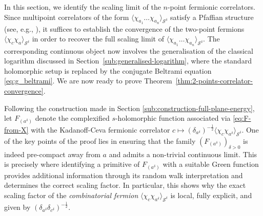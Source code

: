 \documentclass[reqno]{amsart}
\numberwithin{equation}{section}
\theoremstyle{definition}
\theoremstyle{remark}
\newcommand\cS{\mathcal{S}}
\begin{document}
In this section, we identify the scaling limit of the $n$-point fermionic correlators. Since multipoint correlators of the form $\langle \chi_{a_1} \ldots \chi_{a_n} \rangle_{\cS^\delta}$ satisfy a Pfaffian structure (see, e.g., \cite[Proposition 2.24]{CHI-mixed}), it suffices to establish the convergence of the two-point fermions $\langle \chi_{c} \chi_{a} \rangle_{\cS^\delta}$ in order to recover the full scaling limit of $\langle \chi_{a_1} \ldots \chi_{a_n} \rangle_{\cS^\delta}$. The corresponding continuous object now involves the generalisation of the classical logarithm discussed in Section~\ref{sub:generalised-logarithm}, where the standard holomorphic setup is replaced by the conjugate Beltrami equation \eqref{eq:g_beltrami}. We are now ready to prove Theorem~\ref{thm:2-points-correlator-convergence}.

Following the construction made in Section \ref{sub:construction-full-plane-energy}, let $F_{(a^\delta)}$ denote the complexified $s$-holomorphic function associated via \eqref{eq:F-from-X} with the Kadanoff-Ceva fermionic correlator $c \mapsto (\delta_{a^\delta})^{-\frac{1}{2}}\langle \chi_c \chi_{a^\delta} \rangle_{\cS^\delta}$. 
One of the key points of the proof lies in ensuring that the family $(F_{(a^\delta)})_{\delta > 0}$ is indeed pre-compact away from $a$ and admits a non-trivial continuous limit. This is precisely where identifying a primitive of $F_{(a^\delta)}$ with a suitable Green function provides additional information through its random walk interpretation and determines the correct scaling factor. 
In particular, this shows why the exact scaling factor of the \emph{combinatorial fermion} $\langle \chi_c \chi_{a^\delta} \rangle_{\cS^\delta}$ is local, fully explicit, and given by $(\delta_{a^{\delta}}\delta_{c^\delta})^{-\frac12}$.
\end{document}
